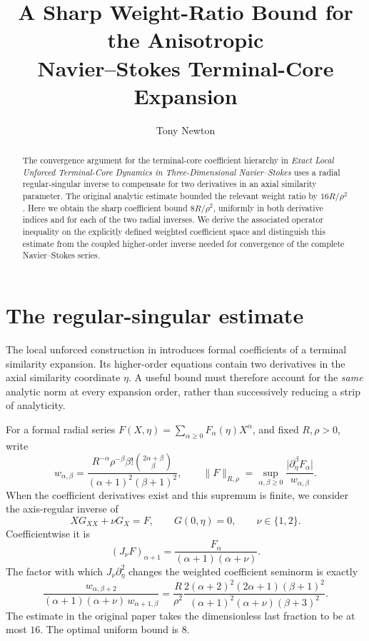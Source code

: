 \documentclass[11pt]{article}
\title{A Sharp Weight-Ratio Bound for the Anisotropic\\
Navier--Stokes Terminal-Core Expansion}
\author{Tony Newton}
\date{}
\begin{document}
\maketitle
\begin{abstract}
The convergence argument for the terminal-core coefficient hierarchy in
\emph{Exact Local Unforced Terminal-Core Dynamics in Three-Dimensional
Navier--Stokes} uses a radial regular-singular inverse to compensate for
two derivatives in an axial similarity parameter.  The original analytic
estimate bounded the relevant weight ratio by $16R/\rho^2$.  Here we obtain
the sharp coefficient bound $8R/\rho^2$, uniformly in both derivative
indices and for each of the two radial inverses.  We derive the associated
operator inequality on the explicitly defined weighted coefficient space
and distinguish this estimate from the coupled higher-order inverse
needed for convergence of the complete Navier--Stokes series.
\end{abstract}

\section{The regular-singular estimate}
The local unforced construction in \cite{newton2026} introduces formal
coefficients of a terminal similarity expansion.  Its higher-order
equations contain two derivatives in the axial similarity coordinate
$\eta$.  A useful bound must therefore account for the \emph{same}
analytic norm at every expansion order, rather than successively
reducing a strip of analyticity.

For a formal radial series
$F(X,\eta)=\sum_{\alpha\geq0}F_\alpha(\eta)X^\alpha$, and fixed $R,\rho>0$,
write
\[
 w_{\alpha,\beta}
 =\frac{R^{-\alpha}\rho^{-\beta}\beta!
   \binom{2\alpha+\beta}{\beta}}
 {(\alpha+1)^2(\beta+1)^2},\qquad
 \|F\|_{R,\rho}
 =\sup_{\alpha,\beta\geq0}
 \frac{\lvert\partial_\eta^\beta F_\alpha\rvert}
 {w_{\alpha,\beta}}.
\]
When the coefficient derivatives exist and this supremum is finite,
we consider the axis-regular inverse of
\[
 XG_{XX}+\nu G_X=F,\qquad G(0,\eta)=0,
 \qquad \nu\in\{1,2\}.
\]
Coefficientwise it is
\[
 (J_\nu F)_{\alpha+1}
  =\frac{F_\alpha}{(\alpha+1)(\alpha+\nu)}.
\]
The factor with which $J_\nu\partial_\eta^2$ changes the weighted
coefficient seminorm is exactly
\begin{equation}\label{eq:ratio}
 \frac{w_{\alpha,\beta+2}}
 {(\alpha+1)(\alpha+\nu)\,w_{\alpha+1,\beta}}
 =\frac{R}{\rho^2}
 \frac{2(\alpha+2)^2(2\alpha+1)(\beta+1)^2}
 {(\alpha+1)^2(\alpha+\nu)(\beta+3)^2}.
\end{equation}
The estimate in the original paper takes the dimensionless last
fraction to be at most $16$.  The optimal uniform bound is $8$.
\end{document}
